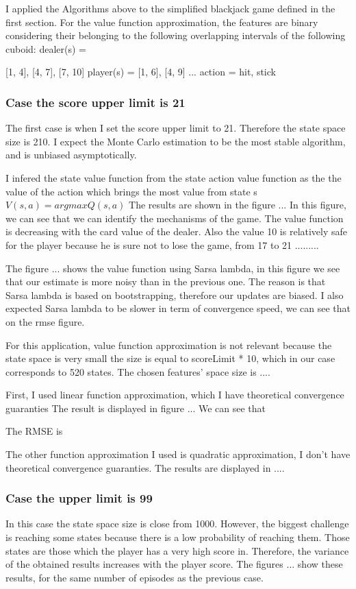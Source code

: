 \documentclass[12pt,a4paper]{article}
\begin{document}
I applied the Algorithms above to the simplified blackjack game defined in the first section.
For the value function approximation, the features are binary considering their belonging to the following overlapping intervals of the following cuboid:
dealer(s) = {[1, 4], [4, 7], [7, 10]
player(s) = {[1, 6], [4, 9] ...}
action = {hit, stick}


\subsubsection{Case the score upper limit is 21}

The first case is when I set the score upper limit to 21. Therefore the state space size is 210.
I expect the Monte Carlo estimation to be the most stable algorithm, and is unbiased asymptotically.

I infered the state value function from the state action value function as the the value of the action which brings the most  value from state s $V(s,a) = argmaxQ(s,a)$  The results are shown in the figure ... In this figure, we can see that we can identify the mechanisms of the game. The value function is decreasing with the card value of the dealer. Also the value 10 is relatively safe for the player because he is sure not to lose the game, from 17 to 21 .........

The figure ... shows the value function using Sarsa lambda, in this figure we see that our estimate is more noisy than in the previous one. The reason is that Sarsa lambda is based on bootstrapping, therefore our updates are biased. I also expected Sarsa lambda to be slower in term of convergence speed, we can see that on the rmse figure.

For this application, value function approximation is not relevant because the state space is very small the size is equal to scoreLimit * 10, which in our case corresponds to 520 states. 	The chosen features' space size is ....  

First, I used linear function approximation, which I have theoretical convergence guaranties The result is displayed in figure ...
We can see that 

The RMSE is 

The other function approximation I used is quadratic approximation, I don't have theoretical convergence guaranties. The results are displayed in ....

\subsubsection{Case the upper limit is 99}
In this case the state space size is close from 1000. However, the biggest challenge is reaching some states because there is a low probability of reaching them. Those states are those which the player has a very high score in. Therefore, the variance of the obtained results increases with the player score. The figures ... show these results, for the same number of episodes as the previous case.

}
\end{document}
